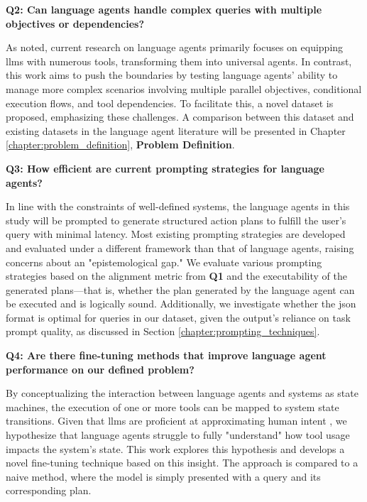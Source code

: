 \pskip

\textbf{Q2: Can language agents handle complex queries with multiple objectives or dependencies?}

\vskip 0.1in

As noted, current research on language agents primarily focuses on equipping \glspl{llm} with numerous tools, transforming them into universal agents. In contrast, this work aims to push the boundaries by testing language agents' ability to manage more complex scenarios involving multiple parallel objectives, conditional execution flows, and tool dependencies. To facilitate this, a novel dataset is proposed, emphasizing these challenges. A comparison between this dataset and existing datasets in the language agent literature will be presented in Chapter \ref{chapter:problem_definition}, \textbf{Problem Definition}.

\pskip

\textbf{Q3: How efficient are current prompting strategies for language agents?}

\vskip 0.1in

In line with the constraints of well-defined systems, the language agents in this study will be prompted to generate structured action plans to fulfill the user’s query with minimal latency. Most existing prompting strategies are developed and evaluated under a different framework than that of language agents, raising concerns about an "epistemological gap." We evaluate various prompting strategies based on the alignment metric from \textbf{Q1} and the executability of the generated plans—that is, whether the plan generated by the language agent can be executed and is logically sound. Additionally, we investigate whether the \gls{json} format is optimal for queries in our dataset, given the output's reliance on task prompt quality, as discussed in Section \ref{chapter:prompting_techniques}.

\pskip

\textbf{Q4: Are there fine-tuning methods that improve language agent performance on our defined problem?}

\vskip 0.1in

By conceptualizing the interaction between language agents and systems as state machines, the execution of one or more tools can be mapped to system state transitions. Given that \glspl{llm} are proficient at approximating human intent \cite{zheng2023judgingllmasajudgemtbenchchatbot}, we hypothesize that language agents struggle to fully "understand" how tool usage impacts the system's state. This work explores this hypothesis and develops a novel fine-tuning technique based on this insight. The approach is compared to a naive method, where the model is simply presented with a query and its corresponding plan.

